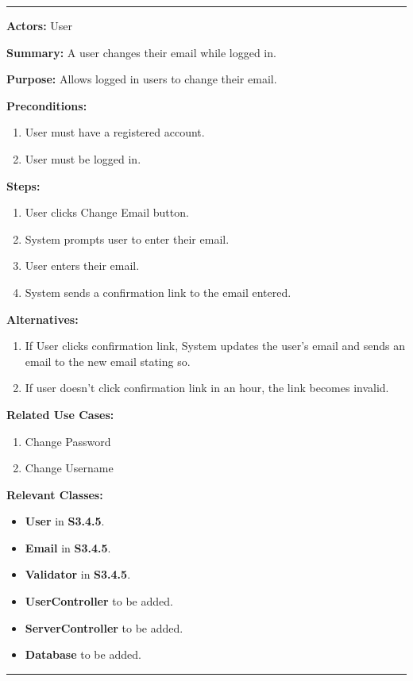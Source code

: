 \documentclass[twoside,letterpaper]{article}
\begin{document}
	\hrule
	\vspace{8pt}
	\noindent\textbf{Actors:} User \newline
	
	\noindent\textbf{Summary:} A user changes their email while logged in.  \newline
	
	\noindent\textbf{Purpose:} Allows logged in users to change their email.  \newline
	
	\noindent\textbf{Preconditions:}
	\begin{enumerate}
		\item User must have a registered account.
		\item User must be logged in.
	\end{enumerate}
	
	\noindent\textbf{Steps:}
	\begin{enumerate}
		\item User clicks Change Email button.
		\item System prompts user to enter their email.
		\item User enters their email.
		\item System sends a confirmation link to the email entered.
	\end{enumerate}
	
	\noindent\textbf{Alternatives:}
	\begin{enumerate}
		\item If User clicks confirmation link, System updates the user's email and sends an email to the new email stating so.
		\item If user doesn't click confirmation link in an hour, the link becomes invalid.
	\end{enumerate}
	
	\noindent\textbf{Related Use Cases:}
	\begin{enumerate}
		\item Change Password
		\item Change Username
	\end{enumerate}
	
	\noindent\textbf{Relevant Classes:}
	\begin{itemize}
		\item \textbf{User} in \textbf{S3.4.5}.
		\item \textbf{Email} in \textbf{S3.4.5}.
		\item \textbf{Validator} in \textbf{S3.4.5}.
		\item \textbf{UserController} to be added.
		\item \textbf{ServerController} to be added.
		\item \textbf{Database} to be added.
	\end{itemize}
	\vspace{8pt}
	\hrule
	\newpage
	
\end{document}
